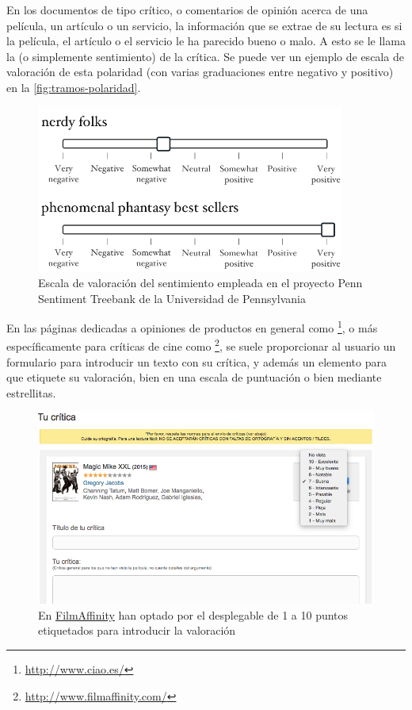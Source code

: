 En los documentos de tipo crítico, o comentarios de opinión acerca de una película, un artículo o un servicio, la información que se extrae de su lectura es si la película, el artículo o el servicio le ha parecido bueno o malo. A esto se le llama la  (o simplemente sentimiento) de la crítica. Se puede ver un ejemplo de escala de valoración de esta polaridad (con varias graduaciones entre negativo y positivo) en la \autoref{fig:tramos-polaridad}.

\begin{figure}[htbp]
\centering
\includegraphics[height=5.5cm]{tramos-polaridad}
\caption[Escala de valoración del sentimiento en Penn Sentiment Treebank]{Escala de valoración del sentimiento empleada en el proyecto Penn Sentiment Treebank de la Universidad de Pennsylvania \citep{Socher2014}}
\label{fig:tramos-polaridad}
\end{figure}


En las páginas dedicadas a opiniones de productos en general como \footnote{\url{http://www.ciao.es/}}, o más específicamente para críticas de cine como \footnote{\url{http://www.filmaffinity.com/}}, se suele proporcionar al usuario un formulario para introducir un texto con su crítica, y además un elemento para que etiquete su valoración, bien en una escala de puntuación o bien mediante estrellitas.

\begin{figure}[htbp]
\centering
\includegraphics[width=\textwidth]{filmaffinity}
\caption[Introducción de la valoración en FilmAffinity]{En \href{http://www.filmaffinity.com/}{FilmAffinity} han optado por el desplegable de 1 a 10 puntos etiquetados para introducir la valoración}
\label{fig:filmaffinity}
\end{figure}

